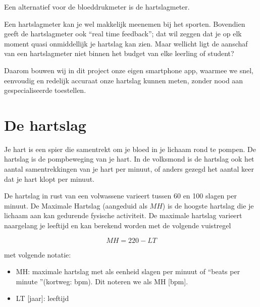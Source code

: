 Een alternatief voor de bloeddrukmeter is de hartslagmeter. 

\begin{minipage}{.5\linewidth}
\end{minipage} 
\begin{minipage}{.5\linewidth}
\end{minipage} 

Een hartslagmeter kan je wel makkelijk meenemen bij het sporten. Bovendien geeft de hartslagmeter ook \textquotedblleft real time feedback\textquotedblright; dat wil zeggen dat je op elk moment quasi onmiddellijk je hartslag kan zien. Maar wellicht ligt de aanschaf van een hartslagmeter niet binnen het budget van elke leerling of student?

Daarom bouwen wij in dit project onze eigen smartphone app, waarmee we snel, eenvoudig en redelijk accuraat onze hartslag kunnen meten, zonder nood aan gespecialiseerde toestellen.


\section{De hartslag}
\label{sec:Mod1_Sec2}

Je hart is een spier die samentrekt om je bloed in je lichaam rond te pompen. De hartslag is de pompbeweging van je hart. In de volksmond is de hartslag ook het aantal samentrekkingen van je hart per minuut, of anders gezegd het aantal keer dat je hart klopt per minuut.

De hartslag in rust van een volwassene varieert tussen 60 en 100 slagen per minuut. De Maximale Hartslag (aangeduid als $MH$) is de hoogste hartslag die je lichaam aan kan gedurende fysische activiteit. De maximale hartslag varieert naargelang je leeftijd en kan berekend worden met de volgende vuistregel

\begin{equation*}
MH = 220-LT
\end{equation*}

met volgende notatie:
\begin{itemize}
	\item MH: maximale hartslag met als eenheid slagen per minuut of \textquotedblleft beats per minute \textquotedblright (kortweg: bpm). 
	Dit noteren we als MH [bpm].
	\item LT [jaar]: leeftijd
\end{itemize}

